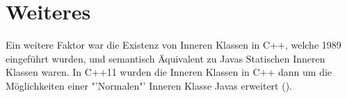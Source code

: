 \section{Weiteres}

Ein weitere Faktor war die Existenz von Inneren Klassen in C++, welche 1989 eingeführt wurden, und semantisch Äquivalent zu Javas Statischen Inneren Klassen waren.
In C++11 wurden die Inneren Klassen in C++ dann um die Möglichkeiten einer "'Normalen"' Inneren Klasse Javas erweitert (\cite{Ellis2007}).
